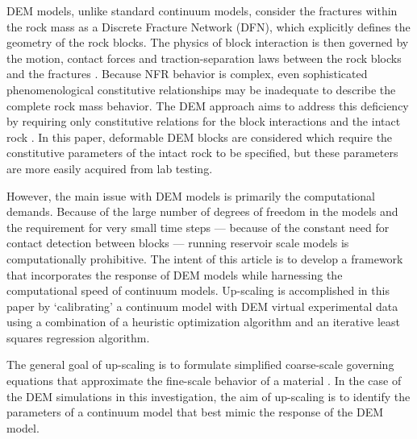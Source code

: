 DEM models, unlike standard continuum models, consider the fractures within the rock mass as a Discrete Fracture Network (DFN), which explicitly defines the geometry of the rock blocks. The physics of block interaction is then governed by the motion, contact forces and traction-separation laws between the rock blocks and the fractures \citep{Thallak_1990}. Because NFR behavior is complex, even sophisticated phenomenological constitutive relationships may be inadequate to describe the complete rock mass behavior. The DEM approach aims to address this deficiency by requiring only constitutive relations for the block interactions and the intact rock \cite{Barbosa_1990}. In this paper,  deformable DEM blocks are considered which require the constitutive parameters of the intact rock to be specified, but these parameters are more easily acquired from lab testing. 

However, the main issue with DEM models is primarily the computational demands. Because of the large number of degrees of freedom in the models and the requirement for very small time steps — because of the constant need for contact detection between blocks — running reservoir scale models is computationally prohibitive. The intent of this article is to develop a framework that incorporates the response of DEM models while harnessing the computational speed of continuum models. Up-scaling is accomplished in this paper by ‘calibrating’ a continuum model with DEM virtual experimental data using a combination of a heuristic optimization algorithm and an iterative least squares regression algorithm.

The general goal of up-scaling is to formulate simplified coarse-scale governing equations that approximate the fine-scale behavior of a material \citep{Geers_2010}. In the case of the DEM simulations in this investigation, the aim of up-scaling is to identify the parameters of a continuum model that best mimic the response of the DEM model.


